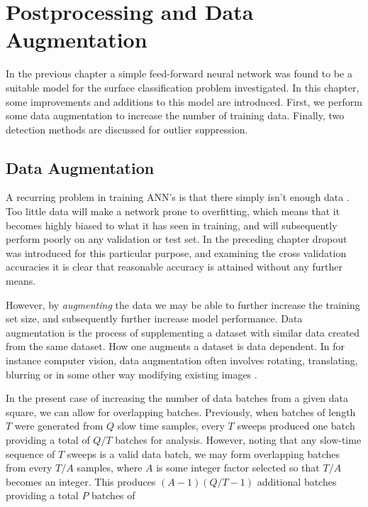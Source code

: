 \chapter{Postprocessing and Data Augmentation}

In the previous chapter a simple feed-forward neural network was found to be a suitable model for the surface classification problem investigated. In this chapter, some improvements and additions to this model are introduced. First, we perform some data augmentation to increase the number of training data. Finally, two detection methods are discussed for outlier suppression.


\section{Data Augmentation}

A recurring problem in training ANN's is that there simply isn't enough data \citep{lemley_bazrafkan_corcoran_2017}. Too little data will make a network prone to overfitting, which means that it becomes highly biased to what it has seen in training, and will subsequently perform poorly on any validation or test set. In the preceding chapter dropout was introduced for this particular purpose, and examining the cross validation accuracies it is clear that reasonable accuracy is attained without any further means.

However, by \emph{augmenting} the data we may be able to further increase the training set size, and subsequently further increase model performance. Data augmentation is the process of supplementing a dataset with similar data created from the same dataset. How one augments a dataset is data dependent. In for instance computer vision, data augmentation often involves rotating, translating, blurring or in some other way modifying existing images \citep{lemley_bazrafkan_corcoran_2017}.

In the present case of increasing the number of data batches from a given data square, we can allow for overlapping batches. Previously, when batches of length $T$ were generated from $Q$ slow time samples, every $T$ sweeps produced one batch providing a total of $Q/T$ batches for analysis. However, noting that any slow-time sequence of $T$ sweeps is a valid data batch, we may form overlapping batches from every $T/A$ samples, where $A$ is some integer factor selected so that $T/A$ becomes an integer. This produces $(A-1)(Q/T-1)$ additional batches providing a total $P$ batches of

